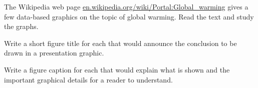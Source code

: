 \begin{Exercises}
 \exercise The Wikipedia web page \url{en.wikipedia.org/wiki/Portal:Global_warming}
   gives a few data-based graphics on the topic of global warming.  
   Read the text and study the graphs.  
   \begin{enumerate*}
	   \item Write a short figure title for each that would announce the conclusion
	   to be drawn in a presentation graphic.  
	   \item Write a figure caption for each that 
	   would explain what is shown and the important graphical details for a reader to
	   understand.
   \end{enumerate*}

\end{Exercises}
